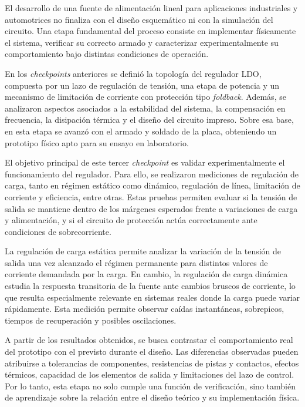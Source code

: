 \documentclass[a4paper,12pt]{article}
\begin{document}
El desarrollo de una fuente de alimentación lineal para aplicaciones industriales y automotrices no finaliza con el diseño esquemático ni con la simulación del circuito. Una etapa fundamental del proceso consiste en implementar físicamente el sistema, verificar su correcto armado y caracterizar experimentalmente su comportamiento bajo distintas condiciones de operación.

En los \textit{checkpoints} anteriores se definió la topología del regulador LDO, compuesta por un lazo de regulación de tensión, una etapa de potencia y un mecanismo de limitación de corriente con protección tipo \textit{foldback}. Además, se analizaron aspectos asociados a la estabilidad del sistema, la compensación en frecuencia, la disipación térmica y el diseño del circuito impreso. Sobre esa base, en esta etapa se avanzó con el armado y soldado de la placa, obteniendo un prototipo físico apto para su ensayo en laboratorio.

El objetivo principal de este tercer \textit{checkpoint} es validar experimentalmente el funcionamiento del regulador. Para ello, se realizaron mediciones de regulación de carga, tanto en régimen estático como dinámico, regulación de línea, limitación de corriente y eficiencia, entre otras. Estas pruebas permiten evaluar si la tensión de salida se mantiene dentro de los márgenes esperados frente a variaciones de carga y alimentación, y si el circuito de protección actúa correctamente ante condiciones de sobrecorriente.

La regulación de carga estática permite analizar la variación de la tensión de salida una vez alcanzado el régimen permanente para distintos valores de corriente demandada por la carga. En cambio, la regulación de carga dinámica estudia la respuesta transitoria de la fuente ante cambios bruscos de corriente, lo que resulta especialmente relevante en sistemas reales donde la carga puede variar rápidamente. Esta medición permite observar caídas instantáneas, sobrepicos, tiempos de recuperación y posibles oscilaciones.

A partir de los resultados obtenidos, se busca contrastar el comportamiento real del prototipo con el previsto durante el diseño. Las diferencias observadas pueden atribuirse a tolerancias de componentes, resistencias de pistas y contactos, efectos térmicos, capacidad de los elementos de salida y limitaciones del lazo de control. Por lo tanto, esta etapa no solo cumple una función de verificación, sino también de aprendizaje sobre la relación entre el diseño teórico y su implementación física.
\end{document}
